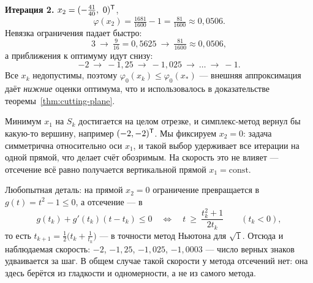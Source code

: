 \begin{example}
\medskip
\noindent\textbf{Итерация 2.} $x_2 = (-\tfrac{41}{40},\ 0)^{\mathsf{T}}$,
\[
  \varphi(x_2) = \tfrac{1681}{1600} - 1 = \tfrac{81}{1600} \approx 0{,}0506 .
\]
Невязка ограничения падает быстро:
\[
  3 \ \to\ \tfrac{9}{16} = 0{,}5625 \ \to\ \tfrac{81}{1600} \approx 0{,}0506 ,
\]
а приближения к оптимуму идут снизу:
\[
  -2 \ \to\ -1{,}25 \ \to\ -1{,}025 \ \to\ \dots \ \to\ -1 .
\]
Все $x_k$ недопустимы, поэтому $\varphi_0(x_k) \le \varphi_0(x_*)$ — внешняя
аппроксимация даёт \emph{нижние} оценки оптимума, что и использовалось в
доказательстве теоремы~\ref{thm:cutting-plane}.
\end{example}

\begin{remark}
Минимум $x_1$ на $S_k$ достигается на целом отрезке, и симплекс-метод вернул бы
какую-то вершину, например $(-2,-2)^{\mathsf{T}}$. Мы фиксируем $x_2 = 0$: задача
симметрична относительно оси $x_1$, и такой выбор удерживает все итерации на
одной прямой, что делает счёт обозримым. На скорость это не влияет — отсечение
всё равно получается вертикальной прямой $x_1 = \text{const}$.
\end{remark}

\begin{idea}
Любопытная деталь: на прямой $x_2 = 0$ ограничение превращается в
$g(t) = t^2 - 1 \le 0$, а отсечение — в
\[
  g(t_k) + g'(t_k)(t - t_k) \le 0
  \quad\Longleftrightarrow\quad
  t \ \ge\ \frac{t_k^2 + 1}{2 t_k}
  \qquad (t_k < 0) ,
\]
то есть $t_{k+1} = \tfrac12\big(t_k + \tfrac{1}{t_k}\big)$ — в точности метод
Ньютона для $\sqrt{1}$. Отсюда и наблюдаемая скорость: $-2$, $-1{,}25$,
$-1{,}025$, $-1{,}0003$ — число верных знаков удваивается за шаг. В общем
случае такой скорости у метода отсечений нет: она здесь берётся из гладкости и
одномерности, а не из самого метода.
\end{idea}

